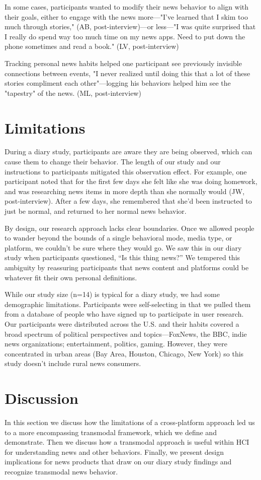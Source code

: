 \documentclass[sigchi]{acmart}
\begin{document}
In some cases, participants wanted to modify their news behavior to align with their goals, either to engage with the news more—"I’ve learned that I skim too much through stories," (AB, post-interview)—or less—"I was quite surprised that I really do spend way too much time on my news apps. Need to put down the phone sometimes and read a book." (LV, post-interview)

Tracking personal news habits helped one participant see previously invisible connections between events, "I never realized until doing this that a lot of these stories compliment each other"—logging his  behaviors helped him see the "tapestry" of the news. (ML, post-interview)

\section{Limitations}
During a diary study, participants are aware they are being observed, which can cause them to change their behavior. The length of our study and our instructions to participants mitigated this observation effect. For example, one participant noted that for the first few days she felt like she was doing homework, and was researching news items in more depth than she normally would (JW, post-interview). After a few days, she remembered that she’d been instructed to just be normal, and returned to her normal news behavior.

By design, our research approach lacks clear boundaries. Once we allowed people to wander beyond the bounds of a single behavioral mode, media type, or platform, we couldn't be sure where they would go. We saw this in our diary study when participants questioned, “Is this thing news?” We tempered this ambiguity by reassuring participants that news content and platforms could be whatever fit their own personal definitions.

While our study size (n=14) is typical for a diary study, we had some demographic limitations. Participants were self-selecting in that we pulled them from a database of people who have signed up to participate in user research. Our participants were distributed across the U.S. and their habits covered a broad spectrum of political perspectives and topics—FoxNews, the BBC, indie news organizations; entertainment, politics, gaming. However, they were concentrated in urban areas (Bay Area, Houston, Chicago, New York) so this study doesn't include rural news consumers.

\section{Discussion}
In this section we discuss  how the limitations of a cross-platform approach led us to a more encompassing transmodal framework, which we define and demonstrate. Then we discuss how a transmodal approach is useful within HCI for understanding news and other behaviors. Finally, we present design implications for news products that draw on our diary study findings and recognize transmodal news behavior. 
\end{document}
